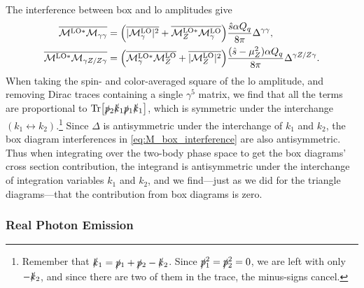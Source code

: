 The interference between box and \gls{lo} amplitudes give
\begin{subequations}
\label{eq:M_box_interference}
\begin{align}
    \overline{\mathcal{M}^{\mathrm{LO}*}\mathcal{M}_{\gamma\gamma}} &= \Bigl(
        \overline{\lvert\mathcal{M}^{\mathrm{LO}}_\gamma\rvert^2} + \overline{\mathcal{M}^{\mathrm{LO}*}_Z \mathcal{M}^{\mathrm{LO}}_\gamma}
    \Bigr) \frac{\hat{s}\alpha Q_q}{8\pi} \Delta^{\gamma\gamma},
    \\
    \overline{\mathcal{M}^{\mathrm{LO}*}\mathcal{M}_{\gamma Z/Z\gamma}} &= \Bigl(
        \overline{\mathcal{M}^{\mathrm{LO}*}_\gamma \mathcal{M}^{\mathrm{LO}}_Z} + \overline{\lvert\mathcal{M}^{\mathrm{LO}}_Z\rvert^2}
    \Bigr) \frac{(\hat{s}-\mu_Z^2)\alpha Q_q}{8\pi} \Delta^{\gamma Z/Z\gamma}.
\end{align}
\end{subequations}
When taking the spin- and color-averaged square of the \gls{lo} amplitude, and removing Dirac traces containing a single $\gamma^5$ matrix, we find that all the terms are proportional to $\operatorname{Tr}\bigl[ \slashed{p}{}_2\slashed{k}{}_1\slashed{p}{}_1\slashed{k}{}_1 \bigr]$, which is symmetric under the interchange $(k_1 \leftrightarrow k_2)$.\footnote{Remember that $\slashed{k}{}_1=\slashed{p}{}_1+\slashed{p}{}_2-\slashed{k}{}_2$. Since $\slashed{p}{}_1^2=\slashed{p}{}_2^2=0$, we are left with only $-\slashed{k}{}_2$, and since there are two of them in the trace, the minus-signs cancel.}
Since $\Delta$ is antisymmetric under the interchange of $k_1$ and $k_2$, the box diagram interferences in \cref{eq:M_box_interference} are also antisymmetric.
Thus when integrating over the two-body phase space to get the box diagrams' cross section contribution, the integrand is antisymmetric under the interchange of integration variables $k_1$ and $k_2$, and we find---just as we did for the triangle diagrams---that the contribution from box diagrams is zero.


\subsubsection{Real Photon Emission}


